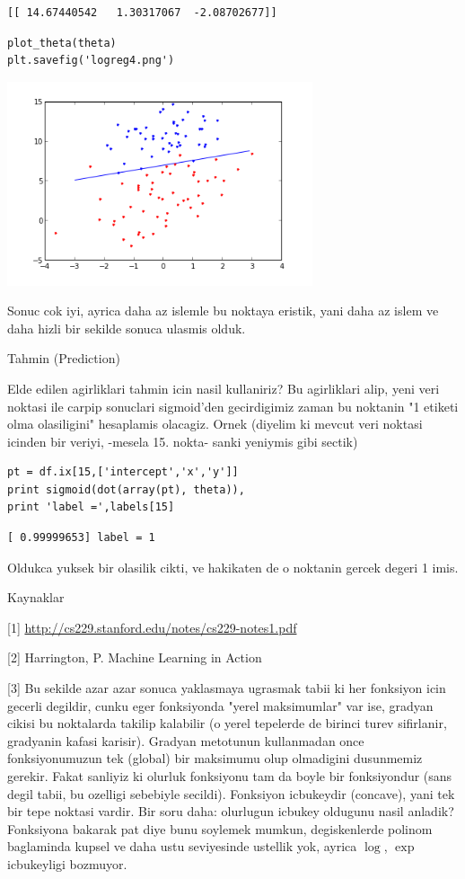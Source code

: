 \documentclass[12pt,fleqn]{article}\usepackage{../common}
\begin{document}
\begin{verbatim}
[[ 14.67440542   1.30317067  -2.08702677]]
\end{verbatim}

\begin{verbatim}
plot_theta(theta)
plt.savefig('logreg4.png')
\end{verbatim}

\includegraphics[height=6cm]{logreg4.png}

Sonuc cok iyi, ayrica daha az islemle bu noktaya eristik, yani daha
az islem ve daha hizli bir sekilde sonuca ulasmis olduk.

Tahmin (Prediction)

Elde edilen agirliklari tahmin icin nasil kullaniriz? Bu agirliklari
alip, yeni veri noktasi ile carpip sonuclari sigmoid'den gecirdigimiz
zaman bu noktanin "1 etiketi olma olasiligini" hesaplamis
olacagiz. Ornek (diyelim ki mevcut veri noktasi icinden bir veriyi,
-mesela 15. nokta- sanki yeniymis gibi sectik)

\begin{verbatim}
pt = df.ix[15,['intercept','x','y']]
print sigmoid(dot(array(pt), theta)), 
print 'label =',labels[15]
\end{verbatim}

\begin{verbatim}
[ 0.99999653] label = 1
\end{verbatim}

Oldukca yuksek bir olasilik cikti, ve hakikaten de o noktanin gercek
degeri 1 imis.

Kaynaklar

[1] \url{http://cs229.stanford.edu/notes/cs229-notes1.pdf}

[2] Harrington, P. Machine Learning in Action

[3] Bu sekilde azar azar sonuca yaklasmaya ugrasmak tabii ki her
fonksiyon icin gecerli degildir, cunku eger fonksiyonda "yerel
maksimumlar" var ise, gradyan cikisi bu noktalarda takilip kalabilir
(o yerel tepelerde de birinci turev sifirlanir, gradyanin kafasi
karisir). Gradyan metotunun kullanmadan once fonksiyonumuzun tek
(global) bir maksimumu olup olmadigini dusunmemiz gerekir. Fakat
sanliyiz ki olurluk fonksiyonu tam da boyle bir fonksiyondur (sans
degil tabii, bu ozelligi sebebiyle secildi). Fonksiyon icbukeydir
(concave), yani tek bir tepe noktasi vardir. Bir soru daha: olurlugun
icbukey oldugunu nasil anladik?  Fonksiyona bakarak pat diye bunu
soylemek mumkun, degiskenlerde polinom baglaminda kupsel ve daha ustu
seviyesinde ustellik yok, ayrica $\log$, $\exp$ icbukeyligi bozmuyor.
\end{document}
